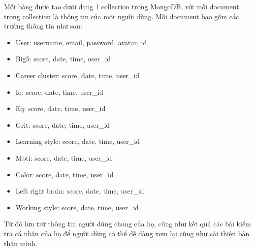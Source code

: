 Mỗi bảng được tạo dưới dạng 1 collection trong MongoDB, với mỗi document trong collection là thông tin của một người dùng. Mỗi document bao gồm các trường thông tin như sau:
\begin{itemize}
    \item User: username, email, password, avatar, id
    \item Big5: score, date, time, user\_id
    \item Career cluster: score, date, time, user\_id
    \item Iq: score, date, time, user\_id
    \item Eq: score, date, time, user\_id
    \item Grit: score, date, time, user\_id
    \item Learning style: score, date, time, user\_id
    \item Mbti: score, date, time, user\_id
    \item Color: score, date, time, user\_id
    \item Left right brain: score, date, time, user\_id
    \item Working style: score, date, time, user\_id
\end{itemize}

Từ đó lưu trữ thông tin người dùng chung của họ, cũng như kết quả các bài kiểm tra cá nhân của họ để người dùng có thể dễ dàng xem lại cũng như
cải thiện bản thân mình.